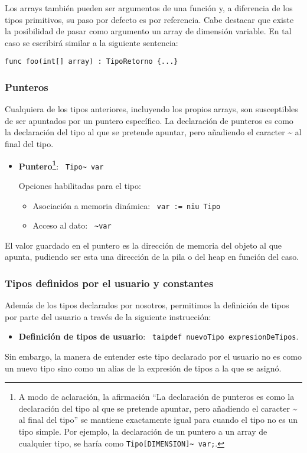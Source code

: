 \documentclass[10pt,a4paper]{article}
\begin{document}
Los arrays también pueden ser argumentos de una función y, a diferencia de los tipos primitivos, su paso por defecto es por referencia. Cabe destacar que existe la posibilidad de pasar como argumento un array de dimensión variable. En tal caso se escribirá similar a la siguiente sentencia: 
\begin{center}
    \texttt{\color{blue}func foo(int[] array) : TipoRetorno \{...\}}
\end{center}



\subsubsection{Punteros}
Cualquiera de los tipos anteriores, incluyendo los propios arrays, son susceptibles de ser apuntados por un puntero específico. La declaración de punteros es como la declaración del tipo al que se pretende apuntar, pero añadiendo el caracter \~{} al final del tipo.
\begin{itemize}
    \item \textbf{Puntero\footnote{A modo de aclaración, la afirmación ``La declaración de punteros es como la declaración del tipo al que se pretende apuntar, pero añadiendo el caracter \~{} al final del tipo'' se mantiene exactamente igual para cuando el tipo no es un tipo simple. Por ejemplo, la declaración de un puntero a un array de cualquier tipo, se haría como \texttt{Tipo[DIMENSION]\~{} var;}.}}: \texttt{\color{blue} Tipo\~{} var}
    
    Opciones habilitadas para el tipo:
    \begin{itemize}
        \item Asociación a memoria dinámica: \texttt{\color{blue} var := niu Tipo}
        \item Acceso al dato: \texttt{\color{blue} \~{}var}
    \end{itemize}
\end{itemize}
El valor guardado en el puntero es la dirección de memoria del objeto al que apunta, pudiendo ser esta una dirección de la pila o del heap en función del caso.

\subsubsection{Tipos definidos por el usuario y constantes}
Además de los tipos declarados por nosotros, permitimos la definición de tipos por parte del usuario a través de la siguiente instrucción:
\begin{itemize}
    \item \textbf{Definición de tipos de usuario}: \texttt{\color{blue} taipdef nuevoTipo expresionDeTipos}.
\end{itemize}
Sin embargo, la manera de entender este tipo declarado por el usuario no es como un nuevo tipo sino como un alias de la expresión de tipos a la que se asignó.
\end{document}
